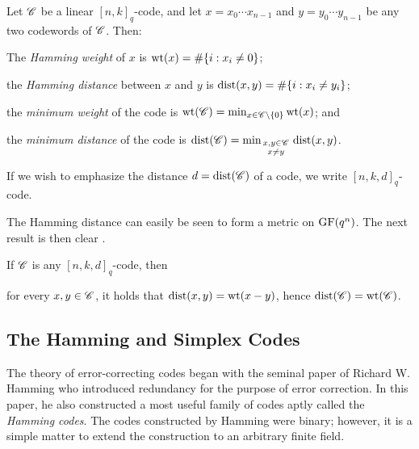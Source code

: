 \documentclass[../../../main]{subfiles}
\begin{document}
\begin{defin}\label{wt-dist}
 Let $\mathscr{C}$ be a linear $[n,k]_q$-code, and let $x=x_0 \cdots x_{n-1}$ and
 $y=y_0 \cdots y_{n-1}$ be any two codewords of $\mathscr{C}$. Then: 
 \begin{defenum}
 \item The {\it Hamming weight} of $x$ is $\text{wt}(x) = \#\{i : x_i \neq 0\}$;
 \item the {\it Hamming distance} between $x$ and $y$ is $\text{dist}(x,y) = \#\{i : x_i \neq y_i\}$;
 \item the {\it minimum weight} of the code is $\text{wt}(\mathscr{C}) = \min_{x \in
     \mathscr{C}\backslash\{0\}} \text{wt}(x)$; and
 \item the {\it minimum distance} of the code is $\text{dist}(\mathscr{C}) = \min_{\begin{smallmatrix}x,y\in\mathscr{C}\\ x \neq y\end{smallmatrix}}\text{dist}(x,y)$. 
 \end{defenum}
 If we wish to emphasize the distance $d=\text{dist}(\mathscr{C})$ of a code, we write $[n,k,d]_q$-code.
\end{defin}

The Hamming distance can easily be seen to form a metric  on $\text{GF}(q^n)$. The next result is then clear \cite[see][Theorem 1.9]{hill-coding}.

\begin{prop}
 If $\mathscr{C}$ is any $[n,k,d]_q$-code, then 
 \begin{defenum}
  \item\label{wt-dist-eq} for every $x,y \in \mathscr{C}$, it holds that $\text{dist}(x,y) = \text{wt}(x-y)$, hence $\text{dist}(\mathscr{C})=\text{wt}(\mathscr{C})$.
 \end{defenum}
\end{prop}

\dinkus


\subsection{The Hamming and Simplex Codes}

The theory of error-correcting codes began with the seminal paper of Richard W. Hamming \citeyearpar{richard-hamming} who introduced redundancy for the purpose of error correction. In this paper, he also constructed a most useful family of codes aptly called the {\it Hamming codes}. The codes constructed by Hamming were binary; however, it is a simple matter to extend the construction to an arbitrary finite field.
\end{document}
